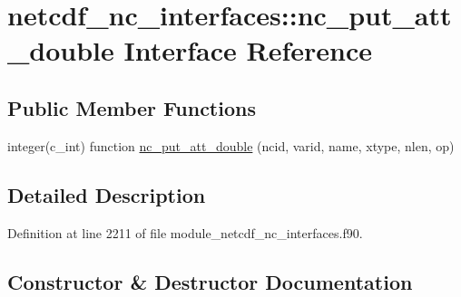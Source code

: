 \hypertarget{interfacenetcdf__nc__interfaces_1_1nc__put__att__double}{}\section{netcdf\+\_\+nc\+\_\+interfaces\+:\+:nc\+\_\+put\+\_\+att\+\_\+double Interface Reference}
\label{interfacenetcdf__nc__interfaces_1_1nc__put__att__double}
\subsection*{Public Member Functions}
\begin{DoxyCompactItemize}
\item 
integer(c\+\_\+int) function \hyperlink{interfacenetcdf__nc__interfaces_1_1nc__put__att__double_a9ae2ebea0675dcbb5431af6e783e3c59}{nc\+\_\+put\+\_\+att\+\_\+double} (ncid, varid, name, xtype, nlen, op)
\end{DoxyCompactItemize}


\subsection{Detailed Description}


Definition at line 2211 of file module\+\_\+netcdf\+\_\+nc\+\_\+interfaces.\+f90.



\subsection{Constructor \& Destructor Documentation}
\mbox{\label{interfacenetcdf__nc__interfaces_1_1nc__put__att__double_a9ae2ebea0675dcbb5431af6e783e3c59}} 
